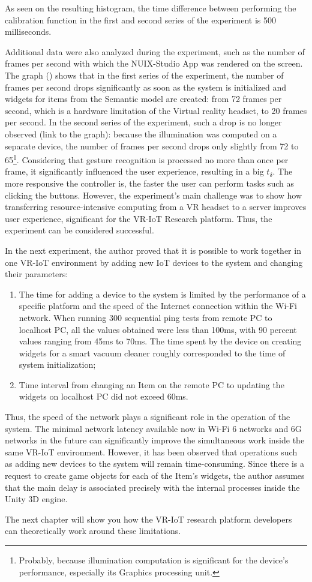 As seen on the resulting histogram, the time difference between performing the calibration function in the first and second series of the experiment is 500 milliseconds.

Additional data were also analyzed during the experiment, such as the number of frames per second with which the NUIX-Studio App was rendered on the screen. The graph () shows that in the first series of the experiment, the number of frames per second drops significantly as soon as the system is initialized and widgets for items from the Semantic model are created: from 72 frames per second, which is a hardware limitation of the Virtual reality headset, to 20 frames per second. In the second series of the experiment, such a drop is no longer observed (link to the graph): because the illumination was computed on a separate device, the number of frames per second drops only slightly from 72 to 65\footnote{Probably, because illumination computation is significant for the device's performance, especially its Graphics processing unit.}. Considering that gesture recognition is processed no more than once per frame, it significantly influenced the user experience, resulting in a big $t_{\delta}$. The more responsive the controller is, the faster the user can perform tasks such as clicking the buttons. However, the experiment's main challenge was to show how transferring resource-intensive computing from a VR headset to a server improves user experience, significant for the VR-IoT Research platform. Thus, the experiment can be considered successful.


In the next experiment, the author proved that it is possible to work together in one VR-IoT environment by adding new IoT devices to the system and changing their parameters:
\begin{enumerate}
    \item The time for adding a device to the system is limited by the performance of a specific platform and the speed of the Internet connection within the Wi-Fi network. When running 300 sequential ping tests from remote PC to localhost PC, all the values ​​obtained were less than 100ms, with 90 percent values ​​ranging from 45ms to 70ms. The time spent by the device on creating widgets for a smart vacuum cleaner roughly corresponded to the time of system initialization;
    \item Time interval from changing an Item on the remote PC to updating the widgets on localhost PC did not exceed 60ms.
\end{enumerate}

Thus, the speed of the network plays a significant role in the operation of the system. The minimal network latency available now in Wi-Fi 6 networks and 6G networks in the future can significantly improve the simultaneous work inside the same VR-IoT environment. However, it has been observed that operations such as adding new devices to the system will remain time-consuming. Since there is a request to create game objects for each of the Item's widgets, the author assumes that the main delay is associated precisely with the internal processes inside the Unity 3D engine.

The next chapter will show you how the VR-IoT research platform developers can theoretically work around these limitations.